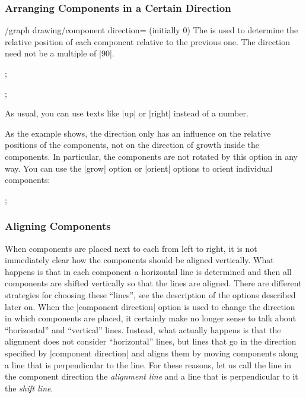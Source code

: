\subsubsection{Arranging Components in a Certain Direction}

\begin{key}{/graph drawing/component direction= (initially 0)}
  The  is used to determine the relative position of each
  component relative to the previous one. The direction need not be a
  multiple of |90|.
\begin{codeexample}[]
\tikz {};
\end{codeexample}
\begin{codeexample}[]
\tikz {};
\end{codeexample}
  As usual, you can use texts like |up| or |right| instead of a
  number.

  As the example shows, the direction only has an influence on the
  relative positions of the components, not on the direction of growth
  inside the components. In particular, the components are not rotated
  by this option in any way. You can use the |grow| option or |orient|
  options to orient individual components:
\begin{codeexample}[]
\tikz {};
\end{codeexample}
\end{key}



\subsubsection{Aligning Components}

When components are placed next to each from left to right, it
is not immediately clear how the components should be aligned
vertically. What happens is that in each component a horizontal line is
determined and then all components are shifted vertically so that the
lines are aligned. There are different strategies for choosing these
``lines'', see the description of the options described later on.
When the |component direction| option is used to change the direction
in which components are placed, it certainly make no longer sense to
talk about ``horizontal'' and ``vertical'' lines. Instead, what
actually happens is that the alignment does not consider
``horizontal'' lines, but lines that go in the direction specified by
|component direction| and aligns them by moving components along a
line that is perpendicular to the line. For these reasons, let us call
the line in the component direction the \emph{alignment line} and a
line that is perpendicular to it the \emph{shift line}.

